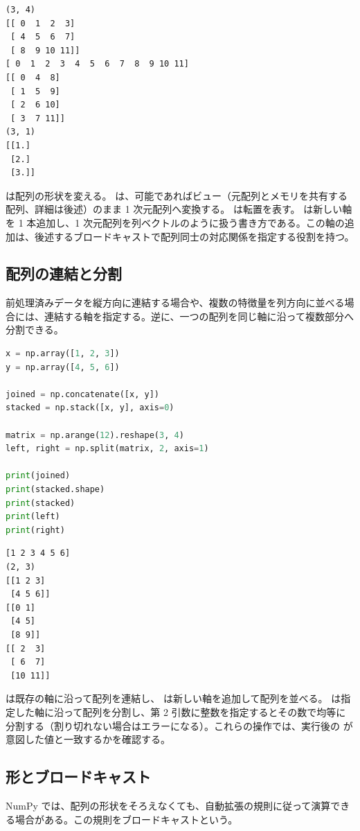 \begin{lstlisting}[numbers=none, xleftmargin=2\zw]
(3, 4)
[[ 0  1  2  3]
 [ 4  5  6  7]
 [ 8  9 10 11]]
[ 0  1  2  3  4  5  6  7  8  9 10 11]
[[ 0  4  8]
 [ 1  5  9]
 [ 2  6 10]
 [ 3  7 11]]
(3, 1)
[[1.]
 [2.]
 [3.]]
\end{lstlisting}

 は配列の形状を変える。 は、可能であればビュー（元配列とメモリを共有する配列、詳細は後述）のまま 1 次元配列へ変換する。 は転置を表す。\code{[:, None]} は新しい軸を 1 本追加し、1 次元配列を列ベクトルのように扱う書き方である。この軸の追加は、後述するブロードキャストで配列同士の対応関係を指定する役割を持つ。

\subsection{配列の連結と分割}

前処理済みデータを縦方向に連結する場合や、複数の特徴量を列方向に並べる場合には、連結する軸を指定する。逆に、一つの配列を同じ軸に沿って複数部分へ分割できる。

\begin{lstlisting}[language=Python]
x = np.array([1, 2, 3])
y = np.array([4, 5, 6])

joined = np.concatenate([x, y])
stacked = np.stack([x, y], axis=0)

matrix = np.arange(12).reshape(3, 4)
left, right = np.split(matrix, 2, axis=1)

print(joined)
print(stacked.shape)
print(stacked)
print(left)
print(right)
\end{lstlisting}

\begin{lstlisting}[numbers=none, xleftmargin=2\zw]
[1 2 3 4 5 6]
(2, 3)
[[1 2 3]
 [4 5 6]]
[[0 1]
 [4 5]
 [8 9]]
[[ 2  3]
 [ 6  7]
 [10 11]]
\end{lstlisting}

 は既存の軸に沿って配列を連結し、 は新しい軸を追加して配列を並べる。 は指定した軸に沿って配列を分割し、第 2 引数に整数を指定するとその数で均等に分割する（割り切れない場合はエラーになる）。これらの操作では、実行後の  が意図した値と一致するかを確認する。

\subsection{形とブロードキャスト}

NumPy では、配列の形状をそろえなくても、自動拡張の規則に従って演算できる場合がある。この規則をブロードキャストという。

